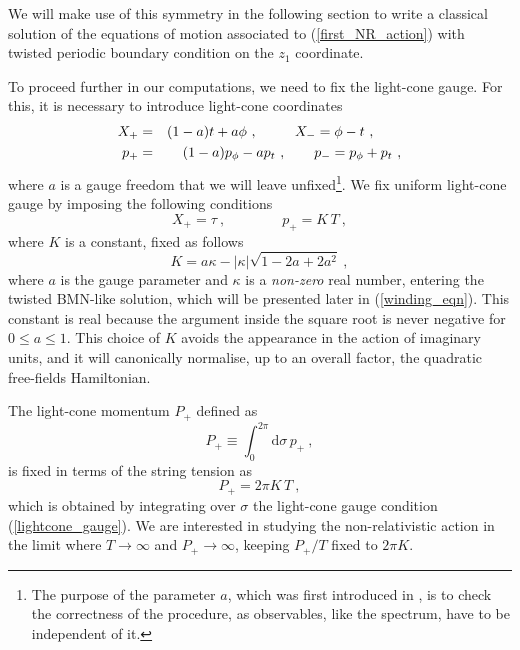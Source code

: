 \documentclass[12pt]{article}
\def\dd{\text{d}}
\numberwithin{equation}{section}
\begin{document}
We will make use of this symmetry in the following section to write a classical solution of the equations of motion associated to (\ref{first_NR_action}) with twisted periodic boundary condition on the $z_1$ coordinate.


To proceed further in our computations, we need to fix the light-cone gauge. For this, it is necessary to introduce light-cone coordinates
\begin{eqnarray}
\notag
X_+ &=& (1-a) t + a \phi \ , \qquad\ \ 
X_- = \phi - t \ , \qquad \\
p_+ &=& (1-a) p_{\phi} - a p_t \ , \qquad
p_- = p_{\phi} + p_t \ , 
\end{eqnarray}
where $a$ is a gauge freedom that we will leave unfixed\footnote{The purpose of the parameter $a$, which was first introduced in \cite{Arutyunov:2006gs}, is to check the correctness of the procedure, as observables, like the spectrum, have to be independent of it.}. We fix uniform light-cone gauge by imposing the following conditions
\begin{equation}
\label{lightcone_gauge}
X_+ = \tau \ , \qquad\qquad p_+ = K \, T \ ,
\end{equation}
where $K$ is a constant, fixed as follows
\begin{equation}
K = a \kappa - |\kappa|\sqrt{1-2a+2a^2} \ ,
\end{equation}
where $a$ is the gauge parameter and $\kappa$ is a \emph{non-zero} real number, entering the twisted BMN-like solution, which will be presented later in (\ref{winding_eqn}). This constant is real because the argument inside the square root is never negative for $0\leq a \leq 1$. This choice of $K$ avoids the appearance in the action of imaginary units, and it will canonically normalise, up to an overall factor, the quadratic free-fields Hamiltonian. 

The light-cone momentum $P_+$ defined as 
\begin{equation}
P_+ \equiv \int_0^{2\pi} \dd \sigma \, p_+ \ , 
\end{equation}
is fixed in terms of the string tension as
\begin{equation}
P_+ = 2\pi K \,T \ , 
\end{equation}
which is obtained by integrating over $\sigma$ the light-cone gauge condition (\ref{lightcone_gauge}).  We are interested in studying the non-relativistic action in the limit where $T\rightarrow \infty$ and $P_+ \rightarrow \infty$, keeping $P_+ / T$ fixed to $2\pi K$. 
\end{document}
